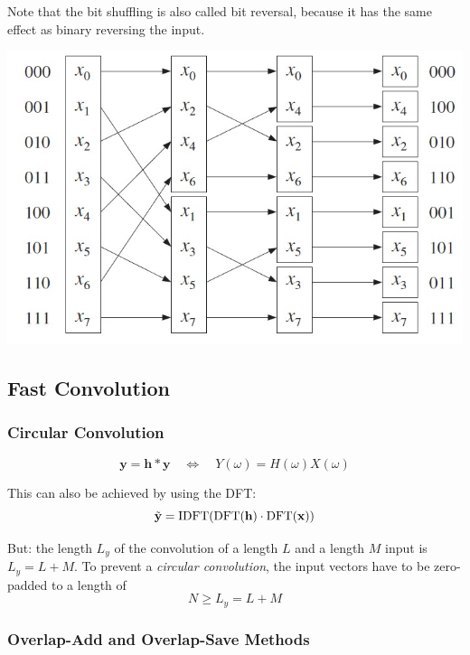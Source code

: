 Note that the bit shuffling is also called bit reversal, because it has
the same effect as binary reversing the input.
\begin{center}
	\includegraphics[width=0.8\linewidth]{images/DFT_FFT_shuffling.jpg}
\end{center}

\subsection{Fast Convolution}
\subsubsection{Circular Convolution}

\begin{equation*}
	\mathbf{y} = \mathbf{h} \ast \mathbf{y} \quad\Leftrightarrow\quad Y(\omega) = H(\omega) X(\omega)
\end{equation*}

This can also be achieved by using the DFT:
\begin{equation*}
	\tilde{\mathbf{y}} = \text{IDFT}(\operatorname{\text{DFT}}(\mathbf{h}) \cdot \operatorname{\text{DFT}}(\mathbf{x}))
\end{equation*}

But: the length $L_y$ of the convolution of a length $L$ and a length $M$
input is $L_y = L + M$. To prevent a \emph{circular convolution}, the
input vectors have to be zero-padded to a length of 
\begin{equation*}
	N \geq L_y = L+M
\end{equation*}

\subsubsection{Overlap-Add and Overlap-Save Methods}

